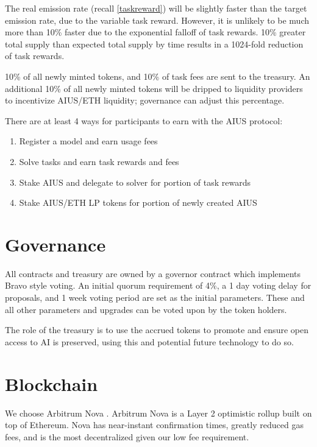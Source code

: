 \documentclass{article}
\begin{document}
The real emission rate (recall \ref{taskreward}) will be slightly faster than the target emission rate, due to the variable task reward. However, it is unlikely to be much more than 10\% faster due to the exponential falloff of task rewards. 10\% greater total supply than expected total supply by time results in a 1024-fold reduction of task rewards.

10\% of all newly minted tokens, and 10\% of task fees are sent to the treasury. An additional 10\% of all newly minted tokens will be dripped to liquidity providers to incentivize AIUS/ETH liquidity; governance can adjust this percentage.


There are at least 4 ways for participants to earn with the AIUS protocol:

\begin{enumerate}
    \item Register a model and earn usage fees
    \item Solve tasks and earn task rewards and fees
    \item Stake AIUS and delegate to solver for portion of task rewards
    \item Stake AIUS/ETH LP tokens for portion of newly created AIUS
\end{enumerate}

\section{Governance}

All contracts and treasury are owned by a governor contract which implements Bravo \cite{bravo} style voting. An initial quorum requirement of 4\%, a 1 day voting delay for proposals, and 1 week voting period are set as the initial parameters. These and all other parameters and upgrades can be voted upon by the token holders.

The role of the treasury is to use the accrued tokens to promote and ensure open access to AI is preserved, using this and potential future technology to do so.


\section{Blockchain}

We choose Arbitrum Nova \cite{arbitrumnitro}. Arbitrum Nova is a Layer 2 optimistic rollup built on top of Ethereum. Nova has near-instant confirmation times, greatly reduced gas fees, and is the most decentralized given our low fee requirement.
\end{document}
